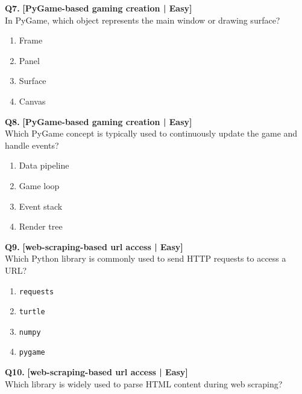 \noindent\textbf{Q7.} \hfill {\small\color{LPUOrange}\textbf{[PyGame-based gaming creation | Easy]}}\\[2pt]
In PyGame, which object represents the main window or drawing surface?

\begin{enumerate}[label=(\alph*),topsep=2pt,itemsep=1pt,partopsep=0pt,parsep=0pt]
    \item \relax Frame
    \item \relax Panel
    \item \relax Surface
    \item \relax Canvas
\end{enumerate}
\vspace{2mm}

\noindent\textbf{Q8.} \hfill {\small\color{LPUOrange}\textbf{[PyGame-based gaming creation | Easy]}}\\[2pt]
Which PyGame concept is typically used to continuously update the game and handle events?

\begin{enumerate}[label=(\alph*),topsep=2pt,itemsep=1pt,partopsep=0pt,parsep=0pt]
    \item \relax Data pipeline
    \item \relax Game loop
    \item \relax Event stack
    \item \relax Render tree
\end{enumerate}
\vspace{2mm}

\noindent\textbf{Q9.} \hfill {\small\color{LPUOrange}\textbf{[web-scraping-based url access | Easy]}}\\[2pt]
Which Python library is commonly used to send HTTP requests to access a URL?

\begin{enumerate}[label=(\alph*),topsep=2pt,itemsep=1pt,partopsep=0pt,parsep=0pt]
    \item \relax \texttt{requests}
    \item \relax \texttt{turtle}
    \item \relax \texttt{numpy}
    \item \relax \texttt{pygame}
\end{enumerate}
\vspace{2mm}

\noindent\textbf{Q10.} \hfill {\small\color{LPUOrange}\textbf{[web-scraping-based url access | Easy]}}\\[2pt]
Which library is widely used to parse HTML content during web scraping?

